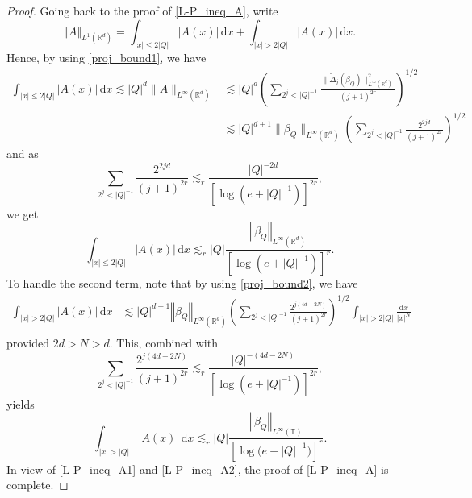 \documentclass[a4paper, leqno, 10pt]{amsart}
\numberwithin{equation}{section}
\newcommand{\dd}{\mathrm{d}}
\newcommand{\T}{\mathbb{T}}
\newcommand{\R}{\mathbb{R}}
\newcommand{\norm}[1]{\left\Vert#1\right\Vert}
\newcommand{\abs}[1]{\left|#1\right|}
\begin{document}
\begin{proof}
Going back to the proof of  \eqref{L-P_ineq_A}, write
\begin{equation}\label{A_dec}
\norm{ A }_{L^1 (\R^d)} = \int_{|x| \leq 2| Q | } |A (x)| \, \dd x +  \int_{| x | > 2| Q | } |A (x)| \, \dd x .
\end{equation}
Hence, by using \eqref{proj_bound1}, we have
\begin{align*}
\int_{|x| \leq 2\abs{Q} } |A (x)| \, \dd x \lesssim | Q |^d \| A \|_{L^{\infty} (\R^d)} 
&\lesssim | Q |^d \left( \sum_{2^j <\abs{Q}^{-1} } \frac{ \| \widetilde{\Delta}_j (\beta_Q) \|^2_{L^{\infty} (\R^d)} }{(j+1)^{2r}} \right)^{1/2}  \\
& \lesssim | Q |^{d+1} \| \beta_Q \|_{L^{\infty} (\R^d)} \left( \sum_{2^j < \abs{Q}^{-1} } \frac{2^{2jd} }{(j+1)^{2r}} \right)^{1/2}
\end{align*}
and as 
\[
\sum_{2^j <\abs{Q}^{-1} } \frac{2^{2jd} }{(j+1)^{2r}} \lesssim_r \frac{ |Q|^{-2d} }{ \left[ \log  \left(e + |Q|^{-1} \right) \right]^{2r}},
\]
we get
\begin{equation}\label{L-P_ineq_A1}
\int_{|x| \leq 2\abs{Q}} |A (x)| \, \dd x  \lesssim_r | Q | \frac{\norm{ \beta_Q }_{L^{\infty} (\R^d)} }{  \left[ \log (e + | Q |^{-1}) \right]^r}.
\end{equation}
To handle the second term, note that by using \eqref{proj_bound2}, we have
\begin{align*}
\int_{|x| >2 \abs{Q}} |A (x)| \, \dd x & \lesssim | Q |^{d+1}  \norm{ \beta_Q }_{L^{\infty} (\R^d)} \left( \sum_{2^j <\abs{Q}^{-1} } \frac{2^{j(4d-2N)}}{(j+1)^{2r}} \right)^{1/2} \int_{|x| > 2| Q | } \frac{\dd x}{|x|^{N}}\\ 
\end{align*}
provided $2d>N>d$. This, combined with
\[
\sum_{2^j < \abs{Q}^{-1} } \frac{2^{j(4d-2N)}}{(j+1)^{2r}} \lesssim_r \frac{| Q |^{-(4d-2N)} }{ \left[ \log \left( e + | Q |^{-1} \right) \right]^{2r}}, 
\]
yields
\begin{equation}\label{L-P_ineq_A2}
\int_{|x| > |Q|} |A (x)| \, \dd x  \lesssim_r | Q |  \frac{ \norm{ \beta_Q }_{L^{\infty} (\T)} } { \left[ \log \big( e + |Q|^{-1} \big) \right]^r} . 
\end{equation}
In view of \eqref{L-P_ineq_A1} and \eqref{L-P_ineq_A2}, the proof of \eqref{L-P_ineq_A} is complete.
	

\end{proof}
\end{document}
